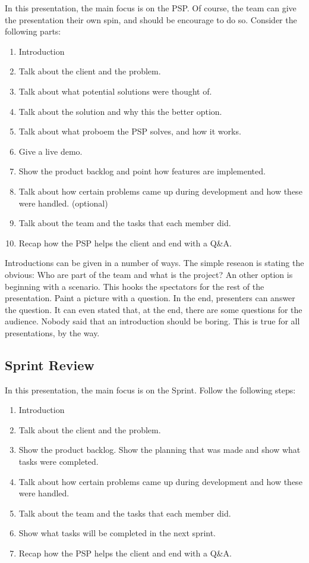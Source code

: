 \documentclass[10pt]{report}
\begin{document}
In this presentation, the main focus is on the PSP. Of course, the team can give the presentation their own spin, and should be encourage to do so. Consider the following parts:

\begin{enumerate}
	\item Introduction
	\item Talk about the client and the problem.
	\item Talk about what potential solutions were thought of.
	\item Talk about the solution and why this the better option.
	\item Talk about what proboem the PSP solves, and how it works.
	\item Give a live demo.
	\item Show the product backlog and point how features are implemented.
	\item Talk about how certain problems came up during development and how these were handled. (optional)
	\item Talk about the team and the tasks that each member did.
	\item Recap how the PSP helps the client and end with a Q\&A.
\end{enumerate}

Introductions can be given in a number of ways. The simple reseaon is stating the obvious: Who are part of the team and what is the project? An other option is beginning with a scenario. This hooks the spectators for the rest of the presentation. Paint a picture with a question. In the end, presenters can answer the question. It can even stated that, at the end, there are some questions for the audience. Nobody said that an introduction should be boring. This is true for all presentations, by the way.

\subsection{Sprint Review}

In this presentation, the main focus is on the Sprint. Follow the following steps:

\begin{enumerate}
	\item Introduction
	\item Talk about the client and the problem.
	\item Show the product backlog. Show the planning that was made and show what tasks were completed.
	\item Talk about how certain problems came up during development and how these were handled.
	\item Talk about the team and the tasks that each member did.
	\item Show what tasks will be completed in the next sprint.
	\item Recap how the PSP helps the client and end with a Q\&A.
\end{enumerate}
\end{document}
